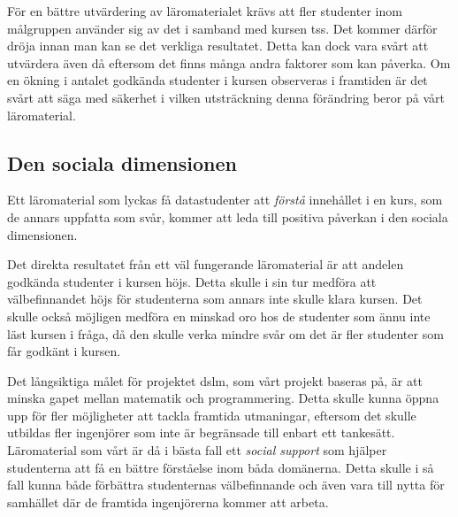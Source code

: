 \documentclass[12pt,a4paper,twoside,openright]{article}
\begin{document}
För en bättre utvärdering av läromaterialet krävs att fler studenter
inom målgruppen använder sig av det i samband med kursen
\gls{tss}. Det kommer därför dröja innan man kan se det verkliga
resultatet. Detta kan dock vara svårt att utvärdera även då eftersom
det finns många andra faktorer som kan påverka. Om en ökning i antalet
godkända studenter i kursen observeras i framtiden är det svårt att
säga med säkerhet i vilken utsträckning denna förändring beror på vårt
läromaterial.


\subsection{Den sociala dimensionen}

Ett läromaterial som lyckas få datastudenter att \emph{förstå}
innehållet i en kurs, som de annars uppfatta som svår, kommer att leda
till positiva påverkan i den sociala
dimensionen. %

Det direkta resultatet från ett väl fungerande läromaterial är att
andelen godkända studenter i kursen höjs. Detta skulle i sin tur
medföra att välbefinnandet höjs för studenterna som annars inte skulle
klara kursen. Det skulle också möjligen medföra en minskad oro hos de
studenter som ännu inte läst kursen i fråga, då den skulle verka
mindre svår om det är fler studenter som får godkänt i kursen.

Det långsiktiga målet för projektet \gls{dslm}, som vårt projekt
baseras på, är att minska gapet mellan matematik och
programmering. %
Detta skulle kunna öppna upp för fler möjligheter att tackla framtida
utmaningar, eftersom det skulle utbildas fler ingenjörer som inte är
begränsade till enbart ett tankesätt.
Läromaterial som vårt  är då i bästa fall ett \emph{social support}
som hjälper studenterna att få en bättre förståelse inom båda domänerna. Detta
skulle i så fall kunna både förbättra studenternas välbefinnande och
även vara till nytta för samhället där de framtida ingenjörerna
kommer att arbeta.
\end{document}

